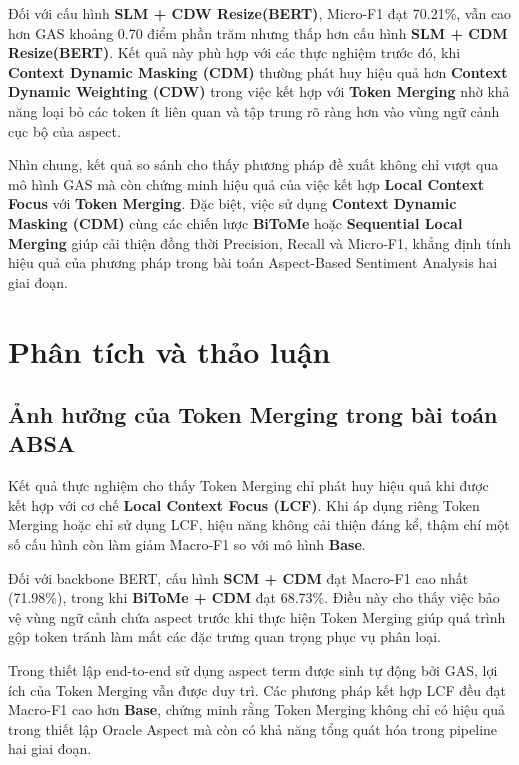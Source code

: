 Đối với cấu hình \textbf{SLM + CDW Resize(BERT)}, Micro-F1 đạt 70.21\%, vẫn cao hơn GAS khoảng 0.70 điểm phần trăm nhưng thấp hơn cấu hình \textbf{SLM + CDM Resize(BERT)}. Kết quả này phù hợp với các thực nghiệm trước đó, khi \textbf{Context Dynamic Masking (CDM)} thường phát huy hiệu quả hơn \textbf{Context Dynamic Weighting (CDW)} trong việc kết hợp với \textbf{Token Merging} nhờ khả năng loại bỏ các token ít liên quan và tập trung rõ ràng hơn vào vùng ngữ cảnh cục bộ của aspect.

Nhìn chung, kết quả so sánh cho thấy phương pháp đề xuất không chỉ vượt qua mô hình GAS mà còn chứng minh hiệu quả của việc kết hợp \textbf{Local Context Focus} với \textbf{Token Merging}. Đặc biệt, việc sử dụng \textbf{Context Dynamic Masking (CDM)} cùng các chiến lược \textbf{BiToMe} hoặc \textbf{Sequential Local Merging} giúp cải thiện đồng thời Precision, Recall và Micro-F1, khẳng định tính hiệu quả của phương pháp trong bài toán Aspect-Based Sentiment Analysis hai giai đoạn.

\section{Phân tích và thảo luận}
\label{sec:discussion}

\subsection{Ảnh hưởng của Token Merging trong bài toán ABSA}

Kết quả thực nghiệm cho thấy Token Merging chỉ phát huy hiệu quả khi
được kết hợp với cơ chế \textbf{Local Context Focus (LCF)}. Khi áp dụng riêng
Token Merging hoặc chỉ sử dụng LCF, hiệu năng không cải thiện đáng kể,
thậm chí một số cấu hình còn làm giảm Macro-F1 so với mô hình
\textbf{Base}.

Đối với backbone BERT, cấu hình \textbf{SCM + CDM} đạt Macro-F1 cao nhất (71.98\%), trong khi
\textbf{BiToMe + CDM} đạt 68.73\%.
Điều này cho thấy việc bảo vệ vùng ngữ cảnh chứa aspect trước khi thực
hiện Token Merging giúp quá trình gộp token tránh làm mất các đặc trưng
quan trọng phục vụ phân loại.

Trong thiết lập end-to-end sử dụng aspect term được sinh tự động bởi
GAS, lợi ích của Token Merging vẫn được duy trì. Các phương pháp kết
hợp LCF đều đạt Macro-F1 cao hơn \textbf{Base}, chứng minh rằng Token
Merging không chỉ có hiệu quả trong thiết lập Oracle Aspect mà còn có
khả năng tổng quát hóa trong pipeline hai giai đoạn.

